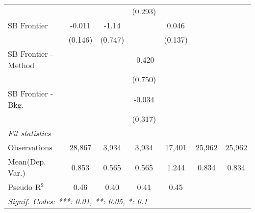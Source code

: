 \begin{tabular}{lcccccc}
                        &               &             & (0.293)       &               &        &   \\   
   SB Frontier          & -0.011        & -1.14       &               & 0.046         &        &   \\   
                        & (0.146)       & (0.747)     &               & (0.137)       &        &   \\   
   SB Frontier - Method &               &             & -0.420        &               &        &   \\   
                        &               &             & (0.750)       &               &        &   \\   
   SB Frontier - Bkg.   &               &             & -0.034        &               &        &   \\   
                        &               &             & (0.317)       &               &        &   \\   
   \midrule
   \emph{Fit statistics}\\
   Observations         & 28,867        & 3,934       & 3,934         & 17,401        & 25,962 & 25,962\\  
Mean(Dep. Var.) & 0.853 & 0.565 & 0.565 & 1.244 & 0.834 & 0.834 \\
   Pseudo R$^2$         & 0.46          & 0.40        & 0.41          & 0.45          &        & \\  
   \midrule \midrule
   \multicolumn{7}{l}{\emph{Signif. Codes: ***: 0.01, **: 0.05, *: 0.1}}\\
\end{tabular}
\par\endgroup
